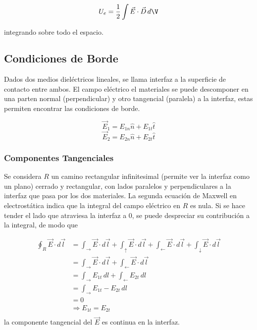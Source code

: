 \[U_e=\frac{1}{2}\int\Vec{E}\cdot\Vec{D}\,d\V\]

integrando sobre todo el espacio.


\subsection{Condiciones de Borde}

Dados dos medios dieléctricos lineales, se llama interfaz a la superficie de contacto entre ambos. El campo eléctrico el materiales se puede descomponer en una parten normal (perpendicular) y otro tangencial (paralela) a la interfaz, estas permiten encontrar las condiciones de borde.

\[\Vec{E}_1 = E_{1n}\hat{n}+E_{1t}\hat{t}\]
\[\Vec{E}_2 = E_{2n}\hat{n}+E_{2t}\hat{t}\]

\subsubsection{Componentes Tangenciales}

Se considera $R$ un camino rectangular infinitesimal (permite ver la interfaz como un plano) cerrado y rectangular, con lados paralelos y perpendiculares a la interfaz que pasa por los dos materiales. La segunda ecuación de Maxwell en electrostática indica que la integral del campo eléctrico en $R$ es nula. Si se hace tender el lado que atraviesa la interfaz a 0, se puede despreciar su contribución a la integral, de modo que


\begin{equation}
\begin{split}
    \oint_R\Vec{E}\cdot d\Vec{l} &= 
    \int_\rightarrow\Vec{E}\cdot d\Vec{l}+
    \int_\uparrow \Vec{E}\cdot d\Vec{l}+
    \int_\leftarrow \Vec{E}\cdot d\Vec{l}+
    \int_\downarrow \Vec{E}\cdot d\Vec{l}\\
    &= \int_\rightarrow\Vec{E}\cdot d\Vec{l}+
    \int_\leftarrow\Vec{E}\cdot d\Vec{l}\\
    &= \int_\rightarrow E_{1t}\,dl+
    \int_\leftarrow E_{2t}\, dl\\
    &= \int_\rightarrow E_{1t}-E_{2t}\, dl\\
    &= 0\\
    &\Rightarrow E_{1t}=E_{2t}\\
\end{split}
\nonumber
\end{equation}
\bigbreak
la componente tangencial del $\Vec{E}$ es continua en la interfaz.

